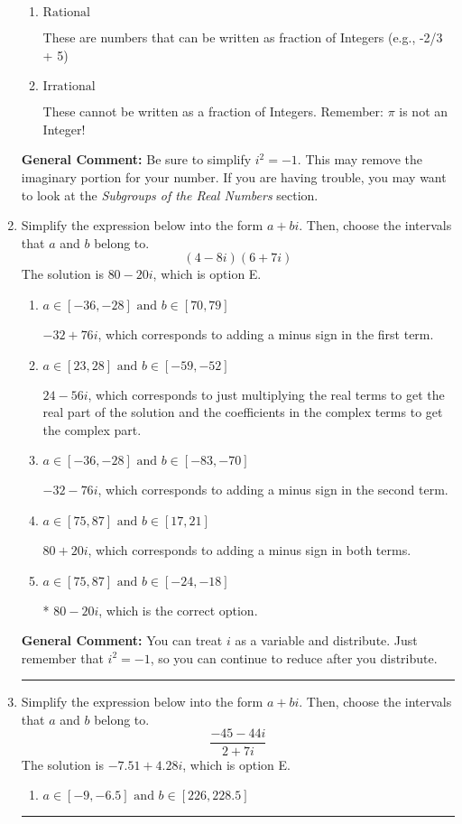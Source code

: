 \documentclass{extbook}[14pt]
\newcommand{\litem}[1]{\item #1

\rule{\textwidth}{0.4pt}}
\begin{document}
\begin{enumerate}
{\begin{enumerate}[label=\Alph*.]
* This is the correct option!
\item \( \text{Rational} \)

These are numbers that can be written as fraction of Integers (e.g., -2/3 + 5)
\item \( \text{Irrational} \)

These cannot be written as a fraction of Integers. Remember: $\pi$ is not an Integer!
\end{enumerate}

\textbf{General Comment:} Be sure to simplify $i^2 = -1$. This may remove the imaginary portion for your number. If you are having trouble, you may want to look at the \textit{Subgroups of the Real Numbers} section.
}
\litem{
Simplify the expression below into the form $a+bi$. Then, choose the intervals that $a$ and $b$ belong to.
\[ (4 - 8 i)(6 + 7 i) \]The solution is \( 80 - 20 i \), which is option E.\begin{enumerate}[label=\Alph*.]
\item \( a \in [-36, -28] \text{ and } b \in [70, 79] \)

 $-32 + 76 i$, which corresponds to adding a minus sign in the first term.
\item \( a \in [23, 28] \text{ and } b \in [-59, -52] \)

 $24 - 56 i$, which corresponds to just multiplying the real terms to get the real part of the solution and the coefficients in the complex terms to get the complex part.
\item \( a \in [-36, -28] \text{ and } b \in [-83, -70] \)

 $-32 - 76 i$, which corresponds to adding a minus sign in the second term.
\item \( a \in [75, 87] \text{ and } b \in [17, 21] \)

 $80 + 20 i$, which corresponds to adding a minus sign in both terms.
\item \( a \in [75, 87] \text{ and } b \in [-24, -18] \)

* $80 - 20 i$, which is the correct option.
\end{enumerate}

\textbf{General Comment:} You can treat $i$ as a variable and distribute. Just remember that $i^2=-1$, so you can continue to reduce after you distribute.
}
\litem{
Simplify the expression below into the form $a+bi$. Then, choose the intervals that $a$ and $b$ belong to.
\[ \frac{-45 - 44 i}{2 + 7 i} \]The solution is \( -7.51  + 4.28 i \), which is option E.\begin{enumerate}[label=\Alph*.]
\item \( a \in [-9, -6.5] \text{ and } b \in [226, 228.5] \)


\end{enumerate}}
\end{enumerate}
\end{document}
